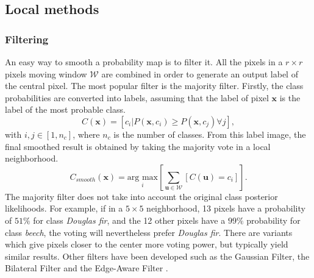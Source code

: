 \subsection{Local methods}
\subsubsection{Filtering}
An easy way to smooth a probability map is to filter it. All the pixels in a $r \times r$ pixels moving window $\mathcal{W}$ are combined in order to generate an output label of the central pixel. The most popular filter is the majority filter. Firstly, the class probabilities are converted into labels, assuming that the label of pixel $\mathbf{x}$ is the label of the most probable class.\\
\begin{equation}
C(\mathbf{x})=[c_{i}|P(\mathbf{x},c_{i}) \geq P(\mathbf{x},c_{j}) \forall j],
\end{equation}
with $i,j \in [1,n_{c}]$, where $n_{c}$ is the number of classes. From this label image, the final smoothed result is obtained by taking the majority vote in a local neighborhood.
\begin{equation}
C_{smooth}(\mathbf{x})=\underset{i}{\text{arg max}}\left[ \sum_{\mathbf{u}\in\mathcal{W}}\left[C(\mathbf{u})=c_{i}\right] \right].
\end{equation}
The majority filter does not take into account the original class posterior likelihoods. For example, if in a $5 \times 5$ neighborhood, 13 pixels have a probability of $51\%$ for class \textit{Douglas fir}, and the 12 other pixels have a $99\%$ probability for class \textit{beech}, the voting will nevertheless prefer \textit{Douglas fir}. There are variants which give pixels closer to the center more voting power, but typically yield similar results.
Other filters have been developed such as the Gaussian Filter, the Bilateral Filter \citep{paris2006fast, paris2009bilateral} and the Edge-Aware Filter \citep{chen2007real}.

